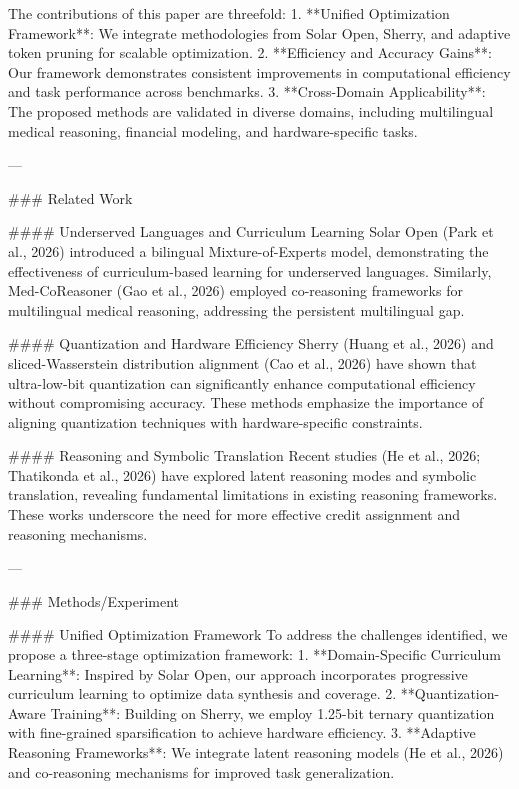 The contributions of this paper are threefold:
1. **Unified Optimization Framework**: We integrate methodologies from Solar Open, Sherry, and adaptive token pruning for scalable optimization.
2. **Efficiency and Accuracy Gains**: Our framework demonstrates consistent improvements in computational efficiency and task performance across benchmarks.
3. **Cross-Domain Applicability**: The proposed methods are validated in diverse domains, including multilingual medical reasoning, financial modeling, and hardware-specific tasks.

---

### Related Work

#### Underserved Languages and Curriculum Learning
Solar Open (Park et al., 2026) introduced a bilingual Mixture-of-Experts model, demonstrating the effectiveness of curriculum-based learning for underserved languages. Similarly, Med-CoReasoner (Gao et al., 2026) employed co-reasoning frameworks for multilingual medical reasoning, addressing the persistent multilingual gap.

#### Quantization and Hardware Efficiency
Sherry (Huang et al., 2026) and sliced-Wasserstein distribution alignment (Cao et al., 2026) have shown that ultra-low-bit quantization can significantly enhance computational efficiency without compromising accuracy. These methods emphasize the importance of aligning quantization techniques with hardware-specific constraints.

#### Reasoning and Symbolic Translation
Recent studies (He et al., 2026; Thatikonda et al., 2026) have explored latent reasoning modes and symbolic translation, revealing fundamental limitations in existing reasoning frameworks. These works underscore the need for more effective credit assignment and reasoning mechanisms.

---

### Methods/Experiment

#### Unified Optimization Framework
To address the challenges identified, we propose a three-stage optimization framework:
1. **Domain-Specific Curriculum Learning**: Inspired by Solar Open, our approach incorporates progressive curriculum learning to optimize data synthesis and coverage.
2. **Quantization-Aware Training**: Building on Sherry, we employ 1.25-bit ternary quantization with fine-grained sparsification to achieve hardware efficiency.
3. **Adaptive Reasoning Frameworks**: We integrate latent reasoning models (He et al., 2026) and co-reasoning mechanisms for improved task generalization.

